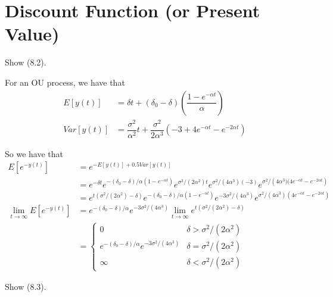 \documentclass{article}
\numberwithin{questioncounter}{section}
\begin{document}
\newpage
\setcounter{section}{7}
\section{Discount Function (or Present Value)}

\begin{question}
Show (8.2).
\end{question}

\begin{solution}
For an OU process, we have that
%
\begin{align*}
E[y(t)] &= \delta t + (\delta_{0} - \delta)\left(\dfrac{1 - e^{-\alpha t}}{\alpha}\right) \\
Var[y(t)] &= \dfrac{\sigma^{2}}{\alpha^2} t + \dfrac{\sigma^2}{2\alpha^3}\left(-3 + 4e^{-\alpha t} - e^{-2\alpha t}\right)
\end{align*}

So we have that
%
\begin{align*}
E[e^{-y(t)}] &= e^{-E[y(t)] + 0.5Var[y(t)]} \\
&= e^{-\delta t} e^{-(\delta_{0} - \delta)/\alpha (1 - e^{-\alpha t})} e^{\sigma^{2} / (2\alpha^2) t} e^{\sigma^2 / (4\alpha^{3}) (-3)} e^{\sigma^{2} / \left(4\alpha^{3}) (4e^{-\alpha t} - e^{-2\alpha t}\right)} \\
&= e^{t\left(\sigma^{2}/(2\alpha^2) - \delta\right)} e^{-(\delta_{0} - \delta)/\alpha (1 - e^{-\alpha t})} e^{-3\sigma^{2}/(4\alpha^{3})} e^{\sigma^{2}/(4\alpha^{3}) (4e^{-\alpha t} - e^{-2\alpha t})} \\
\lim_{t \to \infty} E[e^{-y(t)}] &= e^{-(\delta_{0} - \delta)/\alpha} e^{-3\sigma^{2}/(4\alpha^{3})} \lim_{t \to \infty} e^{t(\sigma^{2}/(2\alpha^2) - \delta)} \\
&= \begin{cases}
0 & \delta > \sigma^{2}/(2\alpha^{2}) \\
e^{-(\delta_{0} - \delta)/\alpha} e^{-3\sigma^{2} / (4\alpha^{3})} & \delta = \sigma^{2} / (2\alpha^{2}) \\
\infty & \delta < \sigma^{2} / (2\alpha^{2})
\end{cases}
\end{align*}

\end{solution}

\begin{question}
Show (8.3).
\end{question}
\end{document}
